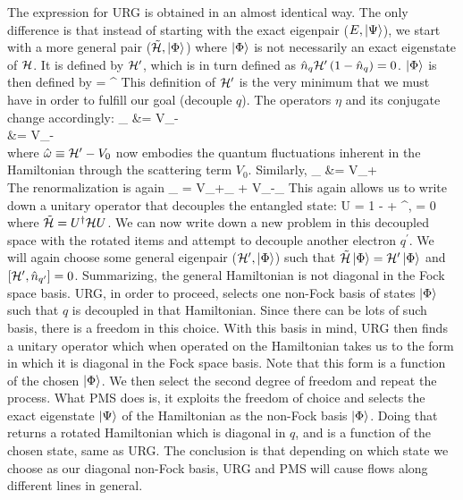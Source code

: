 \documentclass[12pt,twoside]{report}
\numberwithin{equation}{section}
\begin{document}
\pb The expression for URG is obtained in an almost identical way. The only difference is that instead of starting with the exact eigenpair (\(E,\ket{\Psi}\)), we start with a more general pair (\(\tilde {\mathcal{H}}, \ket{\Phi}\)) where \(\ket{\Phi}\) is not necessarily an exact eigenstate of \(\mathcal{H}\). It is defined by \(\mathcal{H}^\prime\), which is in turn defined as \(\hat n_q \mathcal{H}^\prime\left({1 - \hat n_q}\right) = 0\). \(\ket{\Phi}\) is then defined by
\beq
\ham\ket{\Phi} = \ham^\prime \ket{\Phi}
\eeq
This definition of \(\mathcal{H}^\prime\) is the very minimum that we must have in order to fulfill our goal (decouple \(q\)). 
\pb The operators \(\eta\) and its conjugate change accordingly:
\beq
\rr{\eta}_ &= V_-\\
     &= V_-\\
\eeq
where \(\hat \omega \equiv \mathcal{H}^\prime - V_0\) now embodies the quantum fluctuations inherent in the Hamiltonian through the scattering term \(V_0\). Similarly,
\beq
\rr{\eta^\dagger}_ &= V_+\\
\eeq
The renormalization is again
\beq
\rr{\Delta \ham}_ = V_+\rr{\eta}_ + V_-\rr{\eta^\dagger}_
\eeq
This again allows us to write down a unitary operator that decouples the entangled state:
\beq
U =  1 - \eta + \eta^\dagger,  = 0
\eeq
where \(\tilde {\mathcal{H}} = U^\dagger \mathcal{H} U\). We can now write down a new problem in this decoupled space with the rotated items and attempt to decouple another electron \(q^\prime\). We will again choose some general eigenpair (\(\mathcal{H}^\prime,\ket{\Phi}\)) such that \(\tilde{\mathcal{H}}\ket{\Phi} = \mathcal{H}^{\prime}\ket{\Phi}\) and \(\left[{\mathcal{H}^{\prime},\hat n_{q^\prime}}\right]=0\).
\pb Summarizing, the general Hamiltonian is not diagonal in the Fock space basis.
URG, in order to proceed, selects one non-Fock basis of states \(\ket{\Phi}\) such that \(q\) is decoupled in that Hamiltonian.
Since there can be lots of such basis, there is a freedom in this choice.
With this basis in mind, URG then finds a unitary operator which when operated on the Hamiltonian takes us to the form in which it is diagonal in the Fock space basis.
Note that this form is a function of the chosen \(\ket{\Phi}\).
We then select the second degree of freedom and repeat the process.
What PMS does is, it exploits the freedom of choice and selects the exact eigenstate \(\ket{\Psi}\) of the Hamiltonian as the non-Fock basis \(\ket{\Phi}\).
Doing that returns a rotated Hamiltonian which is diagonal in \(q\), and is a function of the chosen state, same as URG. The conclusion is that depending on which state we choose as our diagonal non-Fock basis, URG and PMS will cause flows along different lines in general.
\end{document}
